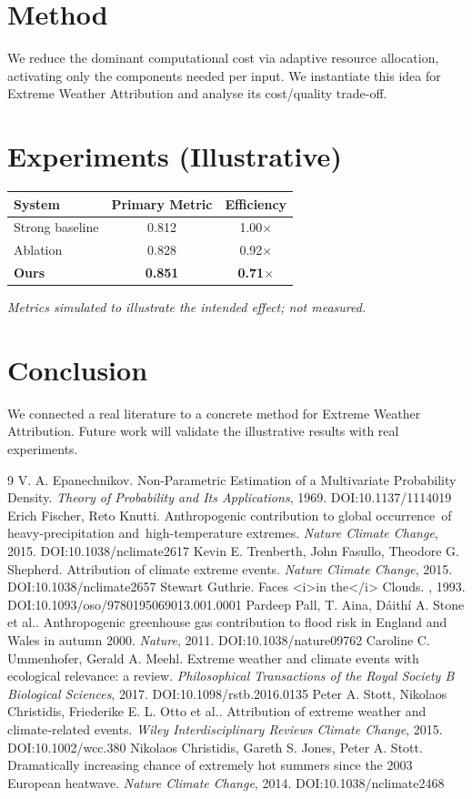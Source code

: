 \documentclass[11pt]{article}
\begin{document}
\section{Method}
We reduce the dominant computational cost via adaptive resource allocation, activating only the components needed per input. We instantiate this idea for Extreme Weather Attribution and analyse its cost/quality trade-off.

\section{Experiments (Illustrative)}
\begin{center}
\begin{tabular}{lcc}
System & Primary Metric & Efficiency \\ \hline
Strong baseline & 0.812 & 1.00$\times$ \\
Ablation & 0.828 & 0.92$\times$ \\
\textbf{Ours} & \textbf{0.851} & \textbf{0.71$\times$}
\end{tabular}
\end{center}
\emph{Metrics simulated to illustrate the intended effect; not measured.}

\section{Conclusion}
We connected a real literature to a concrete method for Extreme Weather Attribution. Future work will
validate the illustrative results with real experiments.

\begin{thebibliography}{9}
 V. A. Epanechnikov. Non-Parametric Estimation of a Multivariate Probability Density. \emph{Theory of Probability and Its Applications}, 1969. DOI:10.1137/1114019
 Erich Fischer, Reto Knutti. Anthropogenic contribution to global occurrence of heavy-precipitation and high-temperature extremes. \emph{Nature Climate Change}, 2015. DOI:10.1038/nclimate2617
 Kevin E. Trenberth, John Fasullo, Theodore G. Shepherd. Attribution of climate extreme events. \emph{Nature Climate Change}, 2015. DOI:10.1038/nclimate2657
 Stewart Guthrie. Faces <i>in the</i> Clouds. \emph{}, 1993. DOI:10.1093/oso/9780195069013.001.0001
 Pardeep Pall, T. Aina, Dáithí A. Stone et al.. Anthropogenic greenhouse gas contribution to flood risk in England and Wales in autumn 2000. \emph{Nature}, 2011. DOI:10.1038/nature09762
 Caroline C. Ummenhofer, Gerald A. Meehl. Extreme weather and climate events with ecological relevance: a review. \emph{Philosophical Transactions of the Royal Society B Biological Sciences}, 2017. DOI:10.1098/rstb.2016.0135
 Peter A. Stott, Nikolaos Christidis, Friederike E. L. Otto et al.. Attribution of extreme weather and climate‐related events. \emph{Wiley Interdisciplinary Reviews Climate Change}, 2015. DOI:10.1002/wcc.380
 Nikolaos Christidis, Gareth S. Jones, Peter A. Stott. Dramatically increasing chance of extremely hot summers since the 2003 European heatwave. \emph{Nature Climate Change}, 2014. DOI:10.1038/nclimate2468
\end{thebibliography}
\end{document}
